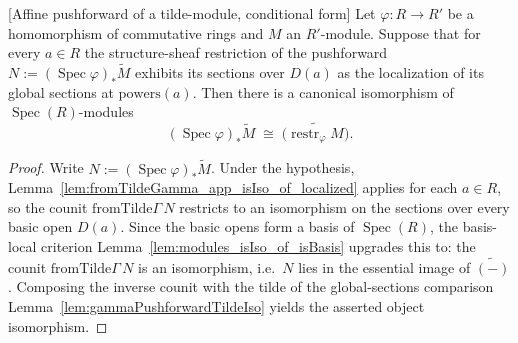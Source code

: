 \begin{lemma}


[Affine pushforward of a tilde-module, conditional form]
  \label{lem:pushforward_spec_tilde_iso_conditional}
  Let \(\varphi : R \to R'\) be a homomorphism of commutative rings and \(M\) an
  \(R'\)-module. Suppose that for every \(a \in R\) the structure-sheaf restriction
  of the pushforward \(N := (\operatorname{Spec}\varphi)_*\widetilde M\) exhibits its
  sections over \(D(a)\) as the localization of its global sections at
  \(\mathrm{powers}(a)\). Then there is a canonical isomorphism of
  \(\operatorname{Spec}(R)\)-modules
  \[
    (\operatorname{Spec}\varphi)_*\widetilde M \;\cong\;
    \widetilde{\bigl(\operatorname{restr}_\varphi M\bigr)} .
  \]
\end{lemma}

\begin{proof}
  Write \(N := (\operatorname{Spec}\varphi)_*\widetilde M\). Under the hypothesis,
  Lemma~\ref{lem:fromTildeGamma_app_isIso_of_localized} applies for each \(a \in R\),
  so the counit \(\mathrm{fromTilde}\Gamma\,N\) restricts to an isomorphism on the
  sections over every basic open \(D(a)\). Since the basic opens form a basis of
  \(\operatorname{Spec}(R)\), the basis-local criterion
  Lemma~\ref{lem:modules_isIso_of_isBasis} upgrades this to: the counit
  \(\mathrm{fromTilde}\Gamma\,N\) is an isomorphism, i.e.\ \(N\) lies in the
  essential image of \(\widetilde{(-)}\). Composing the inverse counit with the
  tilde of the global-sections comparison
  Lemma~\ref{lem:gammaPushforwardTildeIso} yields the asserted object isomorphism.
\end{proof}

